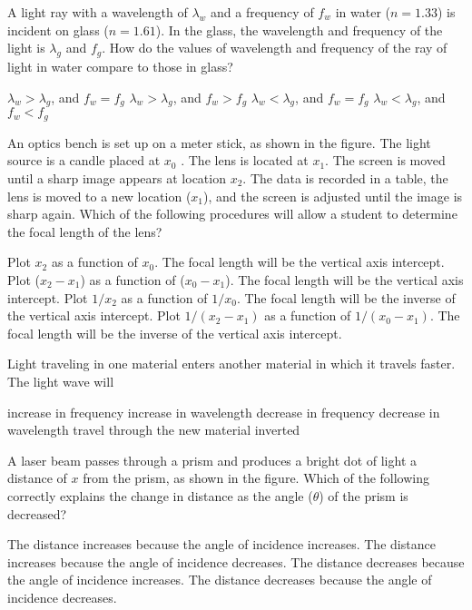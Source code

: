 \documentclass{../../oss-apphys-exam}
\begin{document}
\begin{questions}
  \question A light ray with a wavelength of $\lambda_w$ and a frequency of
  $f_w$ in water ($n=1.33$) is incident on glass ($n=1.61$). In the glass,
  the wavelength and frequency of the light is $\lambda_g$ and $f_g$. How do
  the values of wavelength and frequency of the ray of light in water compare
  to those in glass?
  \begin{choices}
    \choice $\lambda_w>\lambda_g$, and $f_w=f_g$
    \choice $\lambda_w>\lambda_g$, and $f_w>f_g$
    \choice $\lambda_w<\lambda_g$, and $f_w=f_g$
    \choice $\lambda_w<\lambda_g$, and $f_w<f_g$
  \end{choices}
  \newpage
  
  \question An optics bench is set up on a meter stick, as shown in the figure.
  The light source is a candle placed at $x_0$ . The lens is located at $x_1$.
  The screen is moved until a sharp image appears at location $x_2$. The data is
  recorded in a table, the lens is moved to a new location ($x_1$), and the
  screen is adjusted until the image is sharp again. Which of the following
  procedures will allow a student to determine the focal length of the lens?
  \begin{choices}
    \choice Plot $x_2$ as a function of $x_0$. The focal length will be the
    vertical axis intercept.
    \choice Plot ($x_2-x_1$) as a function of ($x_0-x_1$). The focal length will
    be the vertical axis intercept.
    \choice Plot $1/x_2$ as a function of $1/x_0$. The focal length will be the
    inverse of the vertical axis intercept.
    \choice Plot $1/(x_2-x_1)$ as a function of $1/(x_0-x_1)$. The focal length
    will be the inverse of the vertical axis intercept.
  \end{choices}

 \question Light traveling in one material enters another material in which it
  travels faster. The light wave will \underline{\hspace{.5in}}
  \begin{choices}
    \choice increase in frequency
    \choice increase in wavelength
    \choice decrease in frequency
    \choice decrease in wavelength
    \choice travel through the new material inverted
  \end{choices}
  
  \question A laser beam passes through a prism and produces a bright dot of
  light a distance of $x$ from the prism, as shown in the figure. Which of the
  following correctly explains the change in distance as the angle
  ($\theta$) of the prism is decreased?
  \begin{choices}
    \choice The distance increases because the angle of incidence increases.
    \choice The distance increases because the angle of incidence decreases.
    \choice The distance decreases because the angle of incidence increases.
    \choice The distance decreases because the angle of incidence decreases.
  \end{choices}


\end{questions}
\end{document}
